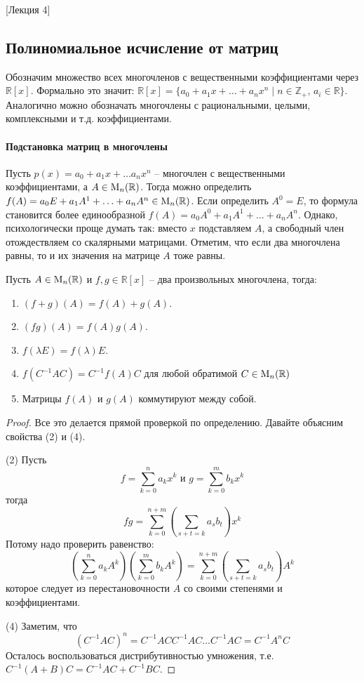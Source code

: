 [Лекция 4]


\subsection{Полиномиальное исчисление от матриц}

Обозначим множество всех многочленов с вещественными коэффициентами через $\mathbb R[x]$.
Формально это значит: $\mathbb R[x]=\{a_0+a_1x + \ldots + a_n x^n\mid n\in \mathbb Z_{+},\, a_i\in \mathbb R\}$.
Аналогично можно обозначать многочлены с рациональными, целыми, комплексными и т.д. коэффициентами.

\paragraph{Подстановка матриц в многочлены}

Пусть $p(x) = a_0+a_1x+\ldots a_n x^n$ -- многочлен с вещественными коэффициентами, а $A\in\operatorname{M}_{n}(\mathbb R)$.
Тогда можно определить $f(A)= a_0 E + a_1 A^1 + \ldots + a_n A^n\in\operatorname{M}_{n}(\mathbb R)$.
Если определить $A^0 = E$, то формула становится более единообразной $f(A)= a_0 A^0 + a_1 A^1 + \ldots + a_n A^n$.
Однако, психологически проще думать так: вместо $x$ подставляем $A$, а свободный член отождествляем со скалярными матрицами.
Отметим, что если два многочлена равны, то и их значения на матрице $A$ тоже равны.

\begin{claim*}
Пусть $A\in\operatorname{M}_{n}(\mathbb R)$ и $f,g\in\mathbb R[x]$ -- два произвольных многочлена, тогда:
\begin{enumerate}
\item $(f+g)(A) = f(A) + g(A)$.

\item $(fg)(A) = f(A)g(A)$.

\item $f(\lambda E) = f(\lambda)E$.

\item $f(C^{-1}AC) = C^{-1}f(A)C$ для любой обратимой $C\in \operatorname{M}_{n}(\mathbb R)$

\item Матрицы $f(A)$ и $g(A)$ коммутируют между собой.
\end{enumerate}
\end{claim*}
\begin{proof}
Все это делается прямой проверкой по определению.
Давайте объясним свойства (2) и (4).

(2) Пусть 
\[
f = \sum_{k=0}^na_k x^k\text{ и }g = \sum_{k=0}^m b_k x^k
\]
тогда 
\[
fg = \sum_{k=0}^{n + m} \left(\sum_{s + t = k }a_s b_t\right) x^k
\]
Потому надо проверить равенство:
\[
\left(\sum_{k=0}^n a_k A^k\right)\left(\sum_{k=0}^mb_k A^k\right) = \sum_{k=0}^{n+m}\left(\sum_{s+t = k} a_s b_t\right)A^k
\]
которое следует из перестановочности $A$ со своими степенями и коэффициентами.

(4) Заметим, что
\[
(C^{-1}AC)^n = C^{-1}ACC^{-1}AC\ldots C^{-1}AC = C^{-1}A^nC
\]
Осталось воспользоваться дистрибутивностью умножения, т.е. $C^{-1}(A + B)C = C^{-1}AC + C^{-1}BC$.
\end{proof}

